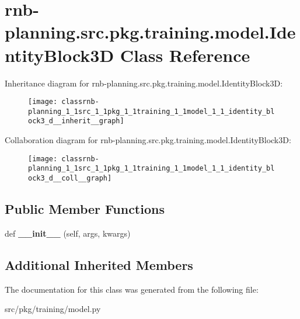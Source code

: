 \hypertarget{classrnb-planning_1_1src_1_1pkg_1_1training_1_1model_1_1_identity_block3_d}{}\section{rnb-\/planning.src.\+pkg.\+training.\+model.\+Identity\+Block3D Class Reference}
\label{classrnb-planning_1_1src_1_1pkg_1_1training_1_1model_1_1_identity_block3_d}


Inheritance diagram for rnb-\/planning.src.\+pkg.\+training.\+model.\+Identity\+Block3D\+:\nopagebreak
\begin{figure}[H]
\begin{center}
\leavevmode
\texttt{[image: classrnb-planning\_1\_1src\_1\_1pkg\_1\_1training\_1\_1model\_1\_1\_identity\_block3\_d\_\_inherit\_\_graph]}
\end{center}
\end{figure}


Collaboration diagram for rnb-\/planning.src.\+pkg.\+training.\+model.\+Identity\+Block3D\+:\nopagebreak
\begin{figure}[H]
\begin{center}
\leavevmode
\texttt{[image: classrnb-planning\_1\_1src\_1\_1pkg\_1\_1training\_1\_1model\_1\_1\_identity\_block3\_d\_\_coll\_\_graph]}
\end{center}
\end{figure}
\subsection*{Public Member Functions}
\begin{DoxyCompactItemize}
\item 
\mbox{\label{classrnb-planning_1_1src_1_1pkg_1_1training_1_1model_1_1_identity_block3_d_ab50c992ec63e49fed83b9aebb43423a0}} 
def {\bfseries \+\_\+\+\_\+init\+\_\+\+\_\+} (self, args, kwargs)
\end{DoxyCompactItemize}
\subsection*{Additional Inherited Members}


The documentation for this class was generated from the following file\+:\begin{DoxyCompactItemize}
\item 
src/pkg/training/model.\+py\end{DoxyCompactItemize}

